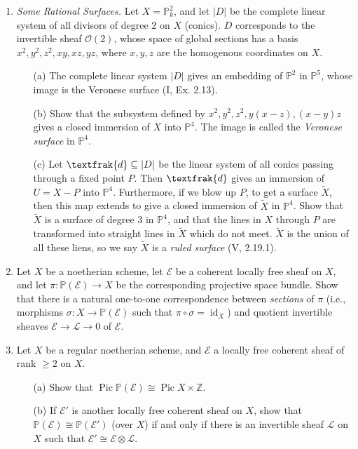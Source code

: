 \documentclass{article}
\newcommand{\goth}[1]{\textfrak{#1}}
\newcommand{\fE}{\mathcal{E}}
\newcommand{\fO}{\mathcal{O}}
\newcommand{\fL}{\mathcal{L}}
\newcommand{\PP}{\mathbb{P}}
\newcommand{\Z}{\mathbb{Z}}
\DeclareMathOperator{\id}{id}
\DeclareMathOperator{\pic}{Pic}
\begin{document}
\begin{enumerate} [label=\textbf{\arabic*.}, leftmargin=-0em]
\item \textit{Some Rational Surfaces.} Let $X = \PP_k^2$, and let $|D|$ be the complete linear system of all divisors of degree $2$ on $X$ (conics). $D$ corresponds to the invertible sheaf $\fO(2)$, whose space of global sections has a basis $x^2, y^2, z^2, xy, xz, yz$, where $x, y, z$ are the homogenous coordinates on $X$.
\begin{itemize}
    \item[(a)] The complete linear system $|D|$ gives an embedding of $\PP^2$ in $\PP^5$, whose image is the Veronese surface (I, Ex. 2.13).
    \item[(b)] Show that the subsystem defined by $x^2, y^2, z^2, y(x - z), (x - y)z$ gives a closed immersion of $X$ into $\PP^4$. The image is called the \textit{Veronese surface} in $\PP^4$.
    \item[(c)] Let $\goth{d} \subseteq |D|$ be the linear system of all conics passing through a fixed point $P$. Then $\goth{d}$ gives an immersion of $U = X - P$ into $\PP^4$. Furthermore, if we blow up $P$, to get a surface $\tilde{X}$, then this map extends to give a closed immersion of $\widetilde{X}$ in $\PP^4$. Show that $\tilde{X}$ is a surface of degree $3$ in $\PP^4$, and that the lines in $X$ through $P$ are transformed into straight lines in $\widetilde{X}$ which do not meet. $\tilde{X}$ is the union of all these liens, so we say $\widetilde{X}$ is a \textit{ruled surface} (V, 2.19.1).
\end{itemize}

\item Let $X$ be a noetherian scheme, let $\fE$ be a coherent locally free sheaf on $X$, and let $\pi : \PP(\fE) \to X$ be the corresponding projective space bundle. Show that there is a natural one-to-one correspondence between \textit{sections} of $\pi$ (i.e., morphisms $\sigma : X \to \PP(\fE)$ such that $\pi \circ \sigma = \id_X$) and quotient invertible sheaves $\fE \to \fL \to 0$ of $\fE$.

\item Let $X$ be a regular noetherian scheme, and $\fE$ a locally free coherent sheaf of rank $\geq 2$ on $X$.
\begin{itemize}
    \item[(a)] Show that $\pic{\PP(\fE)} \cong \pic{X} \times \Z$.
    \item[(b)] If $\fE'$ is another locally free coherent sheaf on $X$, show that $\PP(\fE) \cong \PP(\fE')$ (over $X$) if and only if there is an invertible sheaf $\fL$ on $X$ such that $\fE' \cong \fE \otimes \fL$.
\end{itemize}


\end{enumerate}
\end{document}
